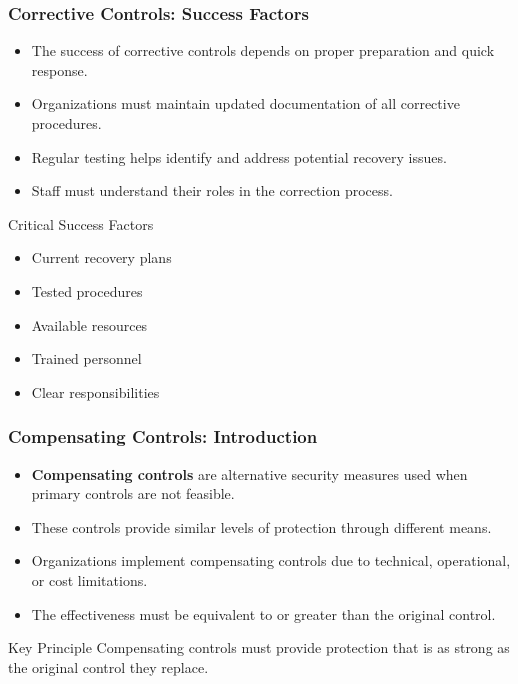 \documentclass{beamer}
\begin{document}
\begin{frame}
    \frametitle{Corrective Controls: Success Factors}
    
    \begin{itemize}
        \item The success of corrective controls depends on proper preparation and quick response.
        
        \item Organizations must maintain updated documentation of all corrective procedures.
        
        \item Regular testing helps identify and address potential recovery issues.
        
        \item Staff must understand their roles in the correction process.
    \end{itemize}
    
    \begin{exampleblock}{Critical Success Factors}
        \begin{itemize}
            \item Current recovery plans
            \item Tested procedures
            \item Available resources
            \item Trained personnel
            \item Clear responsibilities
        \end{itemize}
    \end{exampleblock}
\end{frame}

\begin{frame}
    \frametitle{Compensating Controls: Introduction}
    
    \begin{itemize}
        \item \textbf{Compensating controls} are alternative security measures used when primary controls are not feasible.
        
        \item These controls provide similar levels of protection through different means.
        
        \item Organizations implement compensating controls due to technical, operational, or cost limitations.
        
        \item The effectiveness must be equivalent to or greater than the original control.
    \end{itemize}
    
    \begin{alertblock}{Key Principle}
        Compensating controls must provide protection that is as strong as the original control they replace.
    \end{alertblock}
\end{frame}
\end{document}
